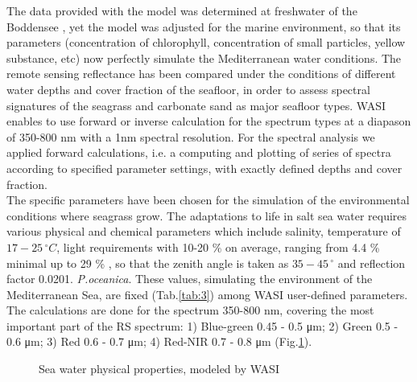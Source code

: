 \documentclass[11pt]{article}
\begin{document}
The data provided with the model was determined at freshwater of the Boddensee \cite{Gege05}\label{Gege05}, 
yet the model was adjusted for the marine environment, so that its parameters (concentration of chlorophyll, concentration of small particles,
yellow substance, etc) now perfectly simulate the Mediterranean water conditions.
The remote sensing reflectance has been compared under the conditions of different water depths and
cover fraction of the seafloor, in order to assess spectral signatures of the seagrass and carbonate sand
as major seafloor types. WASI enables to use forward or inverse calculation for the spectrum types at
a diapason of 350-800 nm with a 1nm spectral resolution. For the spectral analysis we applied
forward calculations, i.e. a computing and plotting of series of spectra according to specified
parameter settings, with exactly defined depths and cover fraction. \\
The specific parameters have been chosen for the simulation of the environmental conditions where seagrass
grow. The adaptations to life in salt sea water requires various physical and chemical parameters
which include salinity, temperature of $17-25\,^{\circ}C$, light requirements with 10-20 \% on average, ranging
from 4.4 \%  minimal up to 29 \% \cite{McKenzie09}\label{McKenzie09}, so that the zenith angle is taken as $35-45\,^{\circ}$
and reflection factor 0.0201. \textit{P.oceanica}. These values, simulating the environment of the Mediterranean Sea, are fixed (Tab.\ref{tab:3}) among WASI user-defined parameters.
The calculations are done for the spectrum 350-800 nm, covering the most important part of the RS spectrum: 1) Blue-green 0.45 - 0.5 μm; 2) Green 0.5 - 0.6 μm; 3) Red 0.6 - 0.7 μm; 4) Red-NIR 0.7 - 0.8 μm (Fig.\ref{fig:4.8}).

\begin{figure}[h]
	\centering
	\caption{Sea water physical properties, modeled by WASI}
	\label{fig:4.8}
\end{figure}
\end{document}
